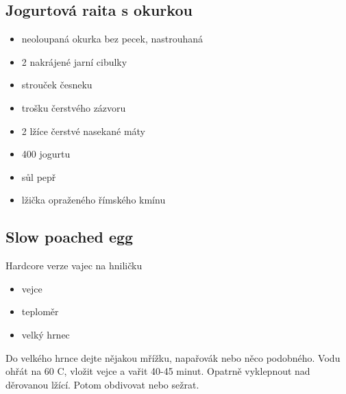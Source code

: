 \documentclass[10pt,a4paper]{article}
\newenvironment{myitemize}
{ \begin{itemize}
    \setlength{\itemsep}{0pt}
    \setlength{\parskip}{0pt}
    \setlength{\parsep}{0pt}     }
{ \end{itemize}                  }
\begin{document}
\subsection{Jogurtová raita s okurkou}
\begin{minipage}[t]{0,5\textwidth}
\begin{myitemize} 
\item neoloupaná okurka bez pecek, nastrouhaná
\item 2 nakrájené jarní cibulky
\item strouček česneku
\item trošku čerstvého zázvoru
\item 2 lžíce čerstvé nasekané máty
\item 400 jogurtu
\item sůl pepř
\item lžička opraženého římského kmínu
\end{myitemize}
\end{minipage}
\begin{minipage}[t]{0,5\textwidth}

\end{minipage}


\subsection{Slow poached egg}
\label{slowpoached}
\begin{minipage}[t]{0,5\textwidth}
Hardcore verze vajec na hniličku
\begin{myitemize} 
\item vejce
\item teploměr
\item velký hrnec
\end{myitemize}
\end{minipage}
\begin{minipage}[t]{0,5\textwidth}
Do velkého hrnce dejte nějakou mřížku, napařovák nebo něco podobného. Vodu ohřát na 60 \degree C, vložit vejce a vařit 40-45 minut. Opatrně vyklepnout nad děrovanou lžící. Potom obdivovat nebo sežrat.
\end{minipage}
\end{document}

